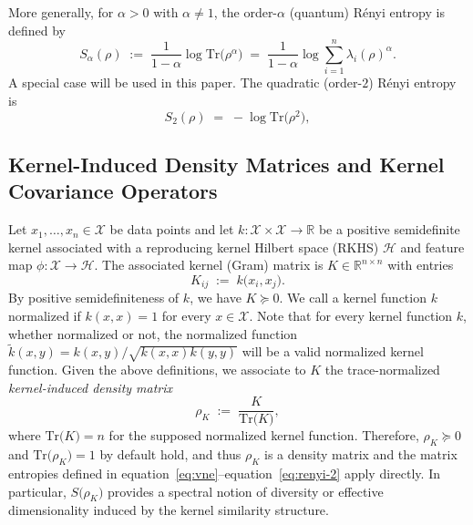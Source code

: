 \documentclass{article}
\theoremstyle{plain}
\theoremstyle{definition}
\def\eqref#1{equation~\ref{#1}}
\begin{document}
More generally, for $\alpha>0$ with $\alpha\neq 1$, the order-$\alpha$ (quantum)
R\'enyi entropy is defined by
\begin{equation}
S_\alpha(\rho)\;:=\;\frac{1}{1-\alpha}\log \mathrm{Tr}\!\bigl(\rho^\alpha\bigr)
\;=\;\frac{1}{1-\alpha}\log \sum_{i=1}^n \lambda_i(\rho)^\alpha.
\label{eq:renyi}
\end{equation}
A special case will be used in this paper. The quadratic (order-$2$) R\'enyi
entropy is
\begin{equation}
S_2(\rho)\;=\;-\log \mathrm{Tr}\bigl(\rho^2\bigr),
\label{eq:renyi-2}
\end{equation}

\subsection{Kernel-Induced Density Matrices and Kernel Covariance Operators}
\label{subsec:prelim:kernel}
Let $x_1,\ldots,x_n\in\mathcal{X}$ be data points and let
$k:\mathcal{X}\times\mathcal{X}\to\mathbb{R}$ be a positive semidefinite kernel
associated with a reproducing kernel Hilbert space (RKHS) $\mathcal{H}$ and
feature map $\phi:\mathcal{X}\to\mathcal{H}$. The associated kernel (Gram)
matrix is $K\in\mathbb{R}^{n\times n}$ with entries
\begin{equation}
K_{ij}\;:=\;k\bigl(x_i,x_j\bigr).
\label{eq:kernel-matrix}
\end{equation}
By positive semidefiniteness of $k$, we have $K\succeq 0$. We call a kernel function $k$ normalized if $k(x,x)=1$ for every $x\in\mathcal{X}$. Note that for every kernel function $k$, whether normalized or not, the normalized function $\widetilde{k}(x,y) = k(x,y)/\sqrt{k(x,x)k(y,y)}$ will be a valid normalized kernel function. Given the above definitions, we associate to $K$ the trace-normalized \emph{kernel-induced density matrix}
\begin{equation}
\rho_K \;:=\; \frac{K}{\mathrm{Tr}\bigl(K\bigr)},
\label{eq:kernel-density}
\end{equation}
where $\mathrm{Tr}\bigl(K\bigr)=n$ for the supposed normalized kernel function. Therefore, $\rho_K\succeq 0$ and
$\mathrm{Tr}\bigl(\rho_K\bigr)=1$ by default hold, and thus $\rho_K$ is a density matrix and the
matrix entropies defined in \eqref{eq:vne}--\eqref{eq:renyi-2} apply directly.
In particular, $S\bigl(\rho_K\bigr)$ provides a spectral notion of diversity or
effective dimensionality induced by the kernel similarity structure.
\end{document}
